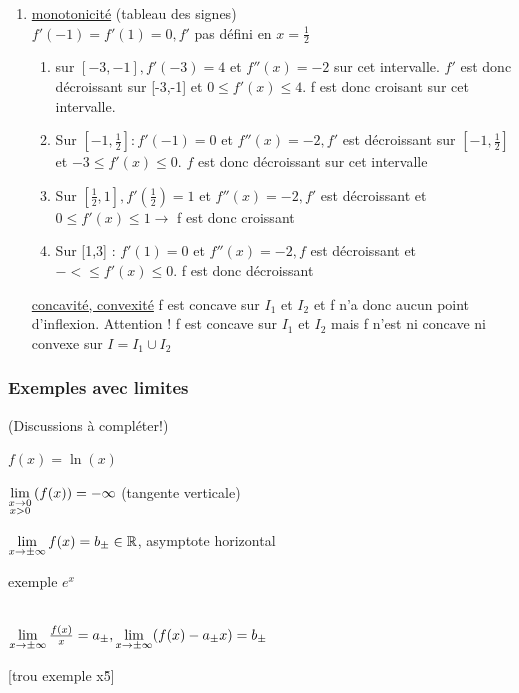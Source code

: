 \documentclass[12pt,a4paper]{article}
\begin{document}
{\begin{enumerate}
	 valeurs aux bords : $f(-3) = -1, f(3) = -3$\\
	 $M = \max\{-1,-3,1,3\} = 3$\\
	 $m=\min\{-1,-3,\frac{3}{4}\} = -3$\\
	 d'où $\Im(f) = [-3,3]$.
	 \item \underline{monotonicité} (tableau des signes)\\
	 $f'(-1) = f'(1) = 0, f'$ pas défini en $x=\frac{1}{2}$
	 \begin{enumerate}[label=\roman*)]
	 	\item sur $[-3,-1], f'(-3) = 4$ et $f''(x) =-2$ sur cet intervalle. $f'$ est donc décroissant  sur [-3,-1] et $0 \leq f'(x) \leq 4$. f est donc croisant sur cet intervalle. 
	 	\item Sur $[-1,\frac{1}{2}] : f'(-1) = 0$ et $f''(x) = -2, f'$ est décroissant sur $[-1,\frac{1}{2}]$ et $-3 \leq f'(x) \leq 0$. $f$ est donc décroissant sur cet intervalle
	 	\item Sur $[\frac{1}{2},1], f'(\frac{1}{2}) = 1$ et $f''(x) = -2, f'$ est décroissant et $0\leq f'(x) \leq 1 \to$ f est donc croissant
	 	\item Sur [1,3] : $f'(1) = 0$ et $f''(x) = -2, f$ est décroissant et $-<\leq f'(x)\leq 0$. f est donc décroissant
	 \end{enumerate}
	 \underline{concavité, convexité} f est concave sur $I_1$ et $I_2$ et f n'a donc aucun point d'inflexion. Attention ! f est concave sur $I_1$ et $I_2$ mais f n'est ni concave ni convexe sur $I = I_1 \cup I_2$
\end{enumerate}

\subsubsection{Exemples avec limites}
(Discussions à compléter!)

 $f(x) = \ln(x)$
\begin{boite}[0.5]
 $\lim\limits_{\substack{x\to 0 \\ x > 0}}\left(f(x)\right) = -\infty$ (tangente verticale)
\end{boite}
\begin{boite}[0.6]
	$\lim\limits_{x\to \pm \infty} f(x) = b_{\pm} \in \mathbb{R}$, asymptote horizontal
\end{boite}
exemple $e^x$
\begin{boite}
	\\
	$\lim\limits_{x\to\pm\infty} \frac{f(x)}{x} = a_{\pm}, \lim\limits_{x\to\pm\infty} (f(x)-a_{\pm}x) = b_{\pm}$
\end{boite}
[trou exemple x\^5]

}
\end{document}
